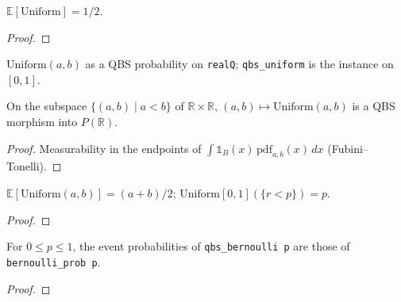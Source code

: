 \begin{lemma}\label{lem:qbs_expect_uniform}
  \rocqok
  $\mathbb{E}[\mathrm{Uniform}] = 1/2$.
\end{lemma}
\begin{proof}\rocqok\end{proof}
\begin{definition}\label{def:qbs_interval_uniform}
  \rocqok
  $\mathrm{Uniform}(a,b)$ as a QBS probability on \texttt{realQ}; \texttt{qbs\_uniform} is the instance on $[0,1]$.
\end{definition}

\begin{lemma}\label{lem:qbs_morphism_uniform_of}
  \rocqok
  On the subspace $\{(a,b) \mid a < b\}$ of $\mathbb{R} \times \mathbb{R}$,
  $(a,b) \mapsto \mathrm{Uniform}(a,b)$ is a QBS morphism into $P(\mathbb{R})$.
\end{lemma}
\begin{proof}\rocqok
  Measurability in the endpoints of $\int \mathbb{1}_B(x)\,
  \mathrm{pdf}_{a,b}(x)\,dx$ (Fubini--Tonelli).
\end{proof}

\begin{lemma}\label{lem:qbs_expect_interval_uniform}
  \rocqok
  $\mathbb{E}[\mathrm{Uniform}(a,b)] = (a+b)/2$; $\mathrm{Uniform}[0,1](\{r < p\}) = p$.
\end{lemma}
\begin{proof}\rocqok\end{proof}

\begin{lemma}\label{lem:qbs_bernoulli_event}
  \rocqok
  For $0 \le p \le 1$, the event probabilities of \texttt{qbs\_bernoulli p} are those of \texttt{bernoulli\_prob p}.
\end{lemma}
\begin{proof}\rocqok\end{proof}


